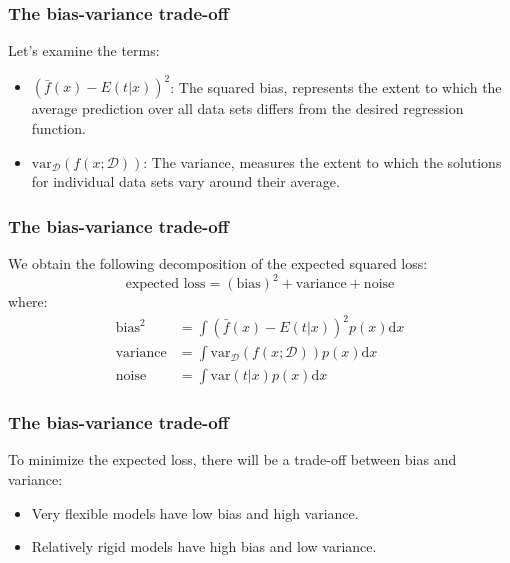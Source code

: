 \documentclass{beamer}
\begin{document}
\begin{frame}
    \frametitle{The bias-variance trade-off}
    Let's examine the terms:
    \begin{itemize}
        \item $(\bar{f}(x)-E(t|x))^{2}$: The squared bias, represents the extent to which the average prediction over all data sets differs from the desired regression function.
        \item $\mathrm{var}_{\mathcal{D}}(f(x;\mathcal{D}))$: The variance, measures the extent to which the solutions for individual data sets vary around their average.
    \end{itemize}
\end{frame}

\begin{frame}
    \frametitle{The bias-variance trade-off}
    We obtain the following decomposition of the expected squared loss:
    \begin{equation*}
        \textrm{expected loss}=(\textrm{bias})^{2}+\textrm{variance}+\textrm{noise}
    \end{equation*}
    where:
    \begin{align*}
        \mathrm{bias}^{2}&=\int(\bar{f}(x)-E(t|x))^{2}p(x)\mathrm{d}x \\
        \mathrm{variance}&=\int\mathrm{var}_{\mathcal{D}}(f(x;\mathcal{D}))p(x)\mathrm{d}x \\
        \mathrm{noise}&=\int\mathrm{var}(t|x)p(x)\mathrm{d}x
    \end{align*}
\end{frame}

\begin{frame}
    \frametitle{The bias-variance trade-off}
    To minimize the expected loss, there will be a trade-off between bias and variance:
    \begin{itemize}
        \item Very flexible models have low bias and high variance.
        \item Relatively rigid models have high bias and low variance.
    \end{itemize}
\end{frame}
\end{document}
